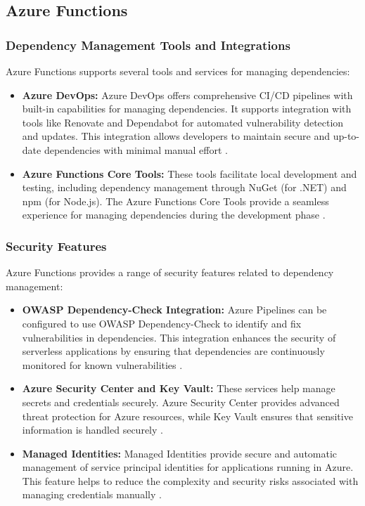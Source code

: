 \documentclass[sigconf]{acmart}
\begin{document}
\subsection{Azure Functions}

\subsubsection{Dependency Management Tools and Integrations}

Azure Functions supports several tools and services for managing dependencies:

\begin{itemize}
    \item \textbf{Azure DevOps:} Azure DevOps offers comprehensive CI/CD pipelines with built-in capabilities for managing dependencies. It supports integration with tools like Renovate and Dependabot for automated vulnerability detection and updates. This integration allows developers to maintain secure and up-to-date dependencies with minimal manual effort \cite{azureDevOps2023}.
    \item \textbf{Azure Functions Core Tools:} These tools facilitate local development and testing, including dependency management through NuGet (for .NET) and npm (for Node.js). The Azure Functions Core Tools provide a seamless experience for managing dependencies during the development phase \cite{azureCoreTools2023}.
\end{itemize}

\subsubsection{Security Features}

Azure Functions provides a range of security features related to dependency management:

\begin{itemize}
    \item \textbf{OWASP Dependency-Check Integration:} Azure Pipelines can be configured to use OWASP Dependency-Check to identify and fix vulnerabilities in dependencies. This integration enhances the security of serverless applications by ensuring that dependencies are continuously monitored for known vulnerabilities \cite{azureowasp2023}.
    \item \textbf{Azure Security Center and Key Vault:} These services help manage secrets and credentials securely. Azure Security Center provides advanced threat protection for Azure resources, while Key Vault ensures that sensitive information is handled securely \cite{azureSecurity2023}.
    \item \textbf{Managed Identities:} Managed Identities provide secure and automatic management of service principal identities for applications running in Azure. This feature helps to reduce the complexity and security risks associated with managing credentials manually \cite{azureManagedIdentities2023}.
\end{itemize}
\end{document}
